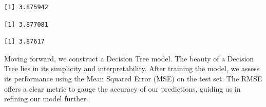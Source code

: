 \documentclass[
  super,
  preprint,
  3p]{elsarticle}
\newenvironment{Shaded}{\begin{snugshade}}{\end{snugshade}}
\newcommand{\CommentTok}[1]{\textcolor[rgb]{0.37,0.37,0.37}{#1}}
\newcommand{\FunctionTok}[1]{\textcolor[rgb]{0.28,0.35,0.67}{#1}}
\newcommand{\NormalTok}[1]{\textcolor[rgb]{0.00,0.23,0.31}{#1}}
\newcommand{\OtherTok}[1]{\textcolor[rgb]{0.00,0.23,0.31}{#1}}
\newcommand{\SpecialCharTok}[1]{\textcolor[rgb]{0.37,0.37,0.37}{#1}}
\begin{document}
\begin{Shaded}
\end{Shaded}

\begin{verbatim}
[1] 3.875942
\end{verbatim}

\begin{Shaded}
\end{Shaded}

\begin{verbatim}
[1] 3.877081
\end{verbatim}

\begin{Shaded}
\end{Shaded}

\begin{verbatim}
[1] 3.87617
\end{verbatim}

Moving forward, we construct a Decision Tree model. The beauty of a
Decision Tree lies in its simplicity and interpretability. After
training the model, we assess its performance using the Mean Squared
Error (MSE) on the test set. The RMSE offers a clear metric to gauge the
accuracy of our predictions, guiding us in refining our model further.
\end{document}
